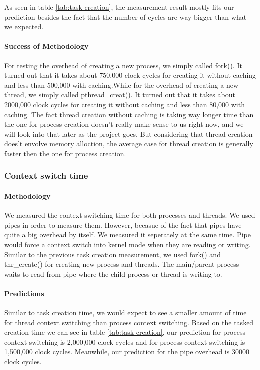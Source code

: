 As seen in table \ref{tab:task-creation}, the measurement result mostly fits our prediction besides the fact that the number of cycles are way bigger than what we expected.
\paragraph{Success of Methodology}
For testing the overhead of creating a new process, we simply called fork(). It turned out that it takes about 750,000 clock cycles for creating it without caching and less than 500,000 with caching.While for the overhead of creating a new thread, we simply called pthread\_creat(). It turned out that it takes about 2000,000 clock cycles for creating it without caching and less than 80,000 with caching.
The fact thread creation without caching is taking way longer time than the one for process creation doesn't really make sense to us right now, and we will look into that later as the project goes. But considering that thread creation does't envolve memory alloction, the average case for thread creation is generally faster then the one for process creation.


\subsubsection{Context switch time}
\paragraph{Methodology}

We measured the context switching time for both processes and threads. We used pipes in order to measure them. However, becasue of the fact that pipes have quite a big overhead by itself. We measured it seperately at the same time. Pipe would force a context switch into kernel mode when they are reading or writing. Similar to the previous task creation measurement, we used fork() and thr\_create() for creating new process and threads. The main/parent process waits to read from pipe where the child process or thread is writing to. 





\paragraph{Predictions}
Similar to task creation time, we would expect to see a smaller amount of time for thread context switching than process context switching. Based on the tasked creation time we can see in table \ref{tab:task-creation}, our prediction for process context switching is 2,000,000 clock cycles and for process context switching is 1,500,000 clock cycles. Meanwhile, our prediction for the pipe overhead is 30000 clock cycles.



